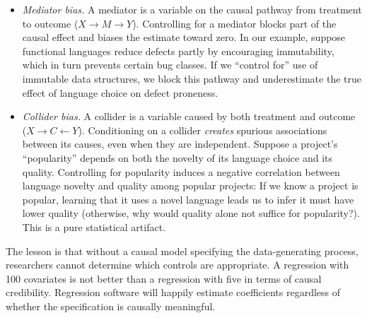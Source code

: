 \begin{itemize}[leftmargin=15pt]
    \item \emph{Mediator bias.}
    A mediator is a variable on the causal pathway from treatment to outcome ($X \to M \to Y$).
    Controlling for a mediator blocks part of the causal effect and biases the estimate toward zero.
    In our example, suppose functional languages reduce defects partly by encouraging immutability, which in turn prevents certain bug classes.
    If we ``control for'' use of immutable data structures, we block this pathway and underestimate the true effect of language choice on defect proneness.
    \item \emph{Collider bias.}
    A collider is a variable caused by both treatment and outcome ($X \to C \leftarrow Y$).
    Conditioning on a collider \emph{creates} spurious associations between its causes, even when they are independent.
    Suppose a project's ``popularity'' depends on both the novelty of its language choice and its quality.
    Controlling for popularity induces a negative correlation between language novelty and quality among popular projects: If we know a project is popular, learning that it uses a novel language leads us to infer it must have lower quality (otherwise, why would quality alone not suffice for popularity?).
    This is a pure statistical artifact.
\end{itemize}
The lesson is that without a causal model specifying the data-generating process, researchers cannot determine which controls are appropriate.
A regression with 100 covariates is not better than a regression with five in terms of causal credibility.
Regression software will happily estimate coefficients regardless of whether the specification is causally meaningful. 

